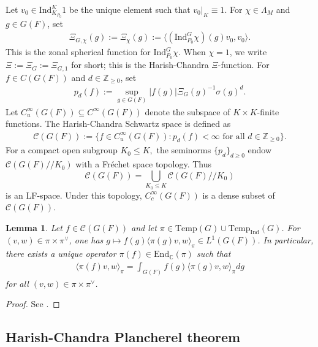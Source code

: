 \documentclass[10pt]{amsart}
\newtheorem{lemma}[theorem]{Lemma}
\theoremstyle{definition}
\numberwithin{equation}{section}
\numberwithin{equation}{subsection}
\newcommand{\Ind}{\mathrm{Ind}}
\newcommand{\Temp}{\mathrm{Temp}}
\begin{document}
Let $v_0\in \Ind_{K_{P_0}}^K1$ be the unique element such that $v_0\vert_{K}\equiv 1$. For $\chi\in \Lambda_M$ and $g\in G(F)$, set
\begin{align}\label{defn:zonal:spherical}
    \Xi_{G,\chi}(g) :=\Xi_{\chi}(g):= \langle(\Ind_{P_0}^G \chi)(g)v_0,v_0\rangle.
\end{align}
This is the zonal spherical function for $\Ind_{P_0}^G \chi$. When $\chi=1$, we write $\Xi:=\Xi_G := \Xi_{G,1}$ for short; this is the Harish-Chandra $\Xi$-function. For $f\in C(G(F))$ and $d\in\mathbb{Z}_{\geq 0}$, set
\begin{align*}
    p_d(f) := \sup_{g\in G(F)} |f(g)|\Xi_G(g)^{-1}\sigma(g)^d.
\end{align*}
Let $C_u^\infty(G(F))\subseteq C^\infty(G(F))$ denote the subspace of $K\times K$-finite functions. The Harish-Chandra Schwartz space is defined as
\begin{align*}
    \mathcal{C}(G(F)):= \{f\in C_u^\infty(G(F)): p_d(f)<\infty \text{ for all }d\in\mathbb{Z}_{\geq 0}\}.
\end{align*}
For a compact open subgroup $K_0\le K,$ the seminorms $\{p_d\}_{d\ge 0}$ endow $\mathcal{C}(G(F)/\!/K_0)$ with a Fr\'echet space topology. Thus
$$\mathcal{C}(G(F))=\bigcup_{K_0\le K}\mathcal{C}(G(F)/\!/K_0)$$
is an LF-space. Under this topology, $C^\infty_c(G(F))$ is a dense subset of $\mathcal{C}(G(F)).$

\begin{lemma}\label{lem:CGconverge} Let $f\in \mathcal{C}(G(F))$ and let $\pi\in \Temp(G)\cup\Temp_\Ind(G)$. For $(v,w)\in \pi\times\pi^\vee$, one has $g\mapsto f(g)\langle \pi(g)v,w\rangle_\pi\in L^1(G(F))$. In particular, there exists a unique operator $\pi(f)\in\mathrm{End}_\mathbb{C}(\pi)$ such that
\begin{align*}
    \langle \pi(f)v,w\rangle_\pi = \int_{G(F)} f(g)\langle \pi(g)v,w\rangle_\pi dg
\end{align*}
for all $(v,w)\in \pi\times \pi^\vee$.
\end{lemma}
\begin{proof} See \cite[III.7, p.~273]{Waldspurger:Plancherel}.    
\end{proof}


\subsection{Harish-Chandra Plancherel theorem}\label{ssec:HCplancherel}
\end{document}
